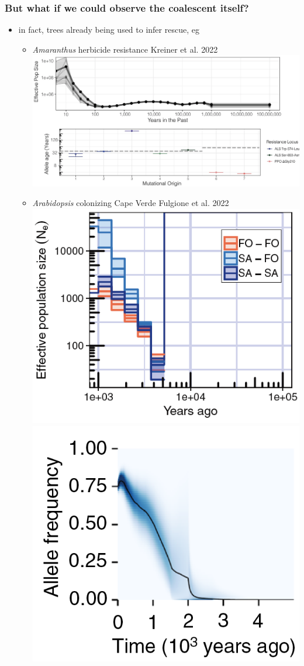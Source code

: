 \documentclass{beamer}
\begin{document}
\begin{frame}
	\frametitle{But what if we could observe the coalescent itself?}

	\begin{itemize}
		\item in fact, trees already being used to infer rescue, eg \pause
		\begin{itemize}
			\item \textit{Amaranthus} herbicide resistance {\tiny Kreiner et al. 2022}
				\includegraphics[width=0.75\linewidth]{../images/kreiner_plot.png} \pause
			\item \textit{Arabidopsis} colonizing Cape Verde {\tiny Fulgione et al. 2022}
				\includegraphics[width=0.4\linewidth]{../images/fulgione_ne.png}
				\includegraphics[width=0.4\linewidth]{../images/fulgione_p.png}
		\end{itemize}
	\end{itemize}

\end{frame}
\end{document}
